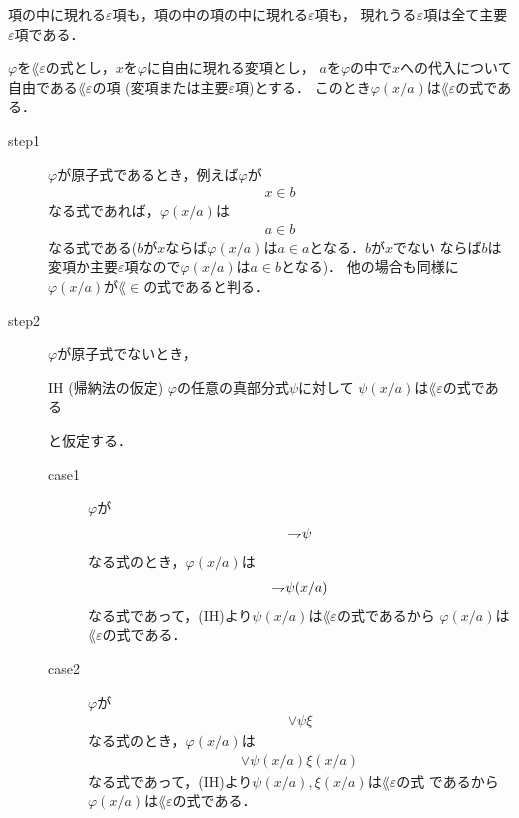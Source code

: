 	項の中に現れる$\varepsilon$項も，項の中の項の中に現れる$\varepsilon$項も，
	現れうる$\varepsilon$項は全て主要$\varepsilon$項である．
	
	\begin{screen}
		\begin{metathm}
		\label{metathm:substitutions_into_L_epsilon_formulas}
			$\varphi$を$\lang{\varepsilon}$の式とし，$x$を$\varphi$に自由に現れる変項とし，
			$a$を$\varphi$の中で$x$への代入について自由である$\lang{\varepsilon}$の項
			(変項または主要$\varepsilon$項)とする．
			このとき$\varphi(x/a)$は$\lang{\varepsilon}$の式である．
		\end{metathm}
	\end{screen}
	
	\begin{metaprf}\mbox{}
		\begin{description}
			\item[step1] $\varphi$が原子式であるとき，例えば$\varphi$が
				\begin{align}
					x \in b
				\end{align}
				なる式であれば，$\varphi(x/a)$は
				\begin{align}
					a \in b
				\end{align}
				なる式である($b$が$x$ならば$\varphi(x/a)$は$a \in a$となる．$b$が$x$でない
				ならば$b$は変項か主要$\varepsilon$項なので$\varphi(x/a)$は$a \in b$となる)．
				他の場合も同様に$\varphi(x/a)$が$\lang{\in}$の式であると判る．
			
			\item[step2] $\varphi$が原子式でないとき，
				\begin{itembox}[l]{IH (帰納法の仮定)}
					$\varphi$の任意の真部分式$\psi$に対して
					$\psi(x/a)$は$\lang{\varepsilon}$の式である
				\end{itembox}
				と仮定する．
				\begin{description}
					\item[case1] $\varphi$が
						\begin{align}
							\rightharpoondown\hspace{-0.25em} \psi
						\end{align}
						なる式のとき，$\varphi(x/a)$は
						\begin{align}
							\rightharpoondown\hspace{-0.25em} \psi(x/a)
						\end{align}
						なる式であって，(IH)より$\psi(x/a)$は$\lang{\varepsilon}$の式であるから
						$\varphi(x/a)$は$\lang{\varepsilon}$の式である．
						
					\item[case2] $\varphi$が
						\begin{align}
							\vee \psi \xi
						\end{align}
						なる式のとき，$\varphi(x/a)$は
						\begin{align}
							\vee \psi(x/a) \xi(x/a)
						\end{align}
						なる式であって，(IH)より$\psi(x/a),\xi(x/a)$は$\lang{\varepsilon}$の式
						であるから$\varphi(x/a)$は$\lang{\varepsilon}$の式である．
					

\end{description}
\end{description}
\end{metaprf}
